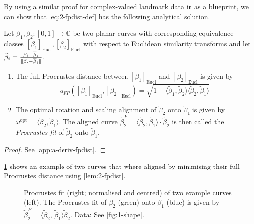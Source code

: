 \noindent By using a similar proof for complex-valued landmark data in \cite[Chap~8]{DrydenMardia2016} as a blueprint, we can show that \cref{eq:2-fpdist-def} has the following analytical solution.

\begin{lemma}
  \label{lem:2-fpdist}
  Let $\beta_1, \beta_2 : [0,1] \rightarrow \mathbb{C}$ be two planar curves with corresponding equivalence classes $[\beta_1]_\text{Eucl}, [\beta_2]_\text{Eucl}$ with respect to Euclidean similarity transforms and let $\widetilde\beta_i = \frac{\beta_i - \overline\beta_i}{\lVert\beta_i - \overline\beta_i\rVert}$.
  \begin{enumerate}[label=\emph{\roman*.)}]
    \item The full Procrustes distance between $[\beta_1]_\text{Eucl}$ and $[\beta_2]_\text{Eucl}$ is given by 
      \begin{equation}
        d_{FP}([\beta_1]_\text{Eucl},[\beta_2]_\text{Eucl}) = \sqrt{ 1 - \langle \widetilde\beta_1, \widetilde\beta_2 \rangle \langle \widetilde\beta_2, \widetilde\beta_1 \rangle }
      \end{equation}
    \item The optimal rotation and scaling alignment of $\widetilde\beta_2$ onto $\widetilde\beta_1$ is given by $\omega^\text{opt} = \langle \widetilde\beta_2, \widetilde\beta_1 \rangle$. 
      The aligned curve $\widetilde\beta_2^{P} = \langle \widetilde\beta_2, \widetilde\beta_1 \rangle \cdot \widetilde\beta_2$ is then called the \emph{Procrustes fit} of $\widetilde\beta_2$ onto $\widetilde\beta_1$.
  \end{enumerate}
  \begin{proof}
    See \cref{app:a-deriv-fpdist}.
  \end{proof}
\end{lemma}

\noindent \cref{fig:2-pfit} shows an example of two curves that where aligned by minimising their full Procrustes distance using \cref{lem:2-fpdist}.

\begin{figure}
  \centering
  \begin{subfigure}{.48\textwidth}
    \centering
  \end{subfigure}\hfill%
  \begin{subfigure}{.48\textwidth}
    \centering
  \end{subfigure}
  \caption{
    Procrustes fit (right; normalised and centred) of two example curves (left).
    The Procrustes fit of $\beta_2$ (green) onto $\beta_1$ (blue) is given by $\widetilde\beta_2^P = \langle \widetilde\beta_2,\, \widetilde\beta_1 \rangle \widetilde\beta_2$.
    Data: See \cref{fig:1-shape}.}
  \label{fig:2-pfit}
\end{figure}


